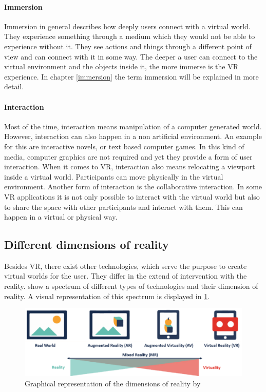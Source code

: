 \paragraph{Immersion} Immersion in general describes how deeply users connect with a virtual world. They experience something through a medium which they would not be able to experience without it. They see actions and things through a different point of view and can connect with it in some way. The deeper a user can connect to the virtual environment and the objects inside it, the more immerse is the VR experience. In chapter \ref{immersion} the term immersion will be explained in more detail.

\paragraph{Interaction} Most of the time, interaction means manipulation of a computer generated world. However, interaction can also happen in a non artificial environment. An example for this are interactive novels, or text based computer games. In this kind of media, computer graphics are not required and yet they provide a form of user interaction. When it comes to VR, interaction also means relocating a viewport inside a virtual world. Participants can move physically in the virtual environment. Another form of interaction is the collaborative interaction. In some VR applications it is not only possible to interact with the virtual world but also to share the space with other participants and interact with them. This can happen in a virtual or physical way.
\subsection{Different dimensions of reality}
Besides VR, there exist other technologies, which serve the purpose to create virtual worlds for the user. They differ in the extend of intervention with the reality. \cite{Tham.2018} show a spectrum of different types of technologies and their dimension of reality. A visual representation of this spectrum is displayed in \ref{fig:spectrum}.\\
\begin{figure}[h!]
  \includegraphics[width=14cm]{kapitel/eps/spectrum-of-reality.pdf}
  \centering
  \caption{Graphical representation of the dimensions of reality by 	  \cite{Lovreglio.2018}}
  \label{fig:spectrum}
\end{figure}

